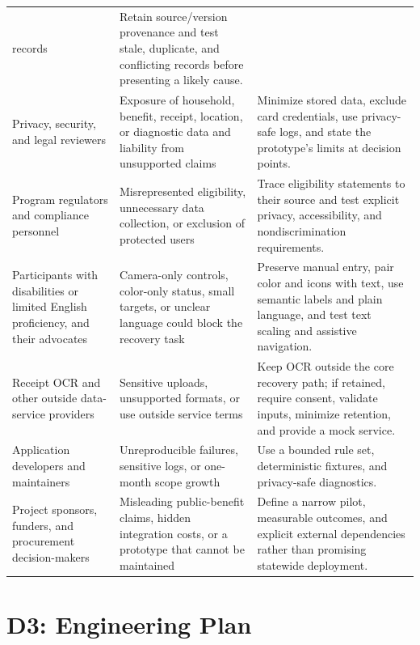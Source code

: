 \documentclass[sigconf]{acmart}
\begin{document}
\begin{table}[t]
\begin{tabular}{L{3.0cm}L{5.0cm}L{7.0cm}}
    records &
    Retain source/version provenance and test stale, duplicate, and conflicting
    records before presenting a likely cause. \\
    \addlinespace
    Privacy, security, and legal reviewers &
    Exposure of household, benefit, receipt, location, or diagnostic data and
    liability from unsupported claims &
    Minimize stored data, exclude card credentials, use privacy-safe logs, and
    state the prototype's limits at decision points. \\
    \addlinespace
    Program regulators and compliance personnel &
    Misrepresented eligibility, unnecessary data collection, or exclusion of
    protected users &
    Trace eligibility statements to their source and test explicit privacy,
    accessibility, and nondiscrimination requirements. \\
    \addlinespace
    Participants with disabilities or limited English proficiency, and their
    advocates &
    Camera-only controls, color-only status, small targets, or unclear language
    could block the recovery task &
    Preserve manual entry, pair color and icons with text, use semantic labels
    and plain language, and test text scaling and assistive navigation. \\
    \addlinespace
    Receipt OCR and other outside data-service providers &
    Sensitive uploads, unsupported formats, or use outside service terms &
    Keep OCR outside the core recovery path; if retained, require consent,
    validate inputs, minimize retention, and provide a mock service. \\
    \addlinespace
    Application developers and maintainers &
    Unreproducible failures, sensitive logs, or one-month scope growth &
    Use a bounded rule set, deterministic fixtures, and privacy-safe
    diagnostics. \\
    \addlinespace
    Project sponsors, funders, and procurement decision-makers &
    Misleading public-benefit claims, hidden integration costs, or a prototype
    that cannot be maintained &
    Define a narrow pilot, measurable outcomes, and explicit external
    dependencies rather than promising statewide deployment. \\
    \bottomrule
  \end{tabular}
\end{table}
\FloatBarrier

\section{D3: Engineering Plan}
\end{document}
